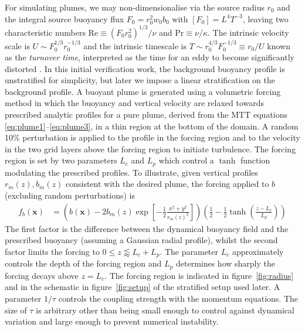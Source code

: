 \documentclass[a4paper]{article}
\begin{document}
For simulating plumes, we may non-dimensionalise via the source radius $r_0$ and the integral source buoyancy
flux $F_0 = r_0^2 w_0 b_0$ with $\left[F_0\right] = L^4 T^{-3}$, leaving two characteristic numbers
$\mathrm{Re} \equiv (F_0r_0^2)^{1/3}/\nu$ and $\mathrm{Pr} \equiv \nu /\kappa$. The intrinsic velocity scale
is $U \sim F_0^{1/3} r_0^{-1/3}$ and the intrinsic timescale is $T \sim r_0^{4/3} F_0^{-1/3} \equiv r_0/U$
known as the \emph{turnover time}, interpreted as the time for an eddy to become significantly distorted
\citep{frisch1995}. In this initial verification work, the background buoyancy profile is unstratified for
simplicity, but later we impose a linear stratification on the background profile. A buoyant plume is
generated using a volumetric forcing method in which the buoyancy and vertical velocity are relaxed towards
prescribed analytic profiles for a pure plume, derived from the MTT equations
\eqref{eq:plume1}--\eqref{eq:plume3}, in a thin region at the bottom of the domain. A random 10\% perturbation
is applied to the profile in the forcing region and to the velocity in the two grid layers above the forcing
region to initiate turbulence. The forcing region is set by two parameters $L_c$ and $L_p$ which control a
$\tanh$ function modulating the prescribed profiles. To illustrate, given vertical profiles $r_m(z), b_m(z)$
consistent with the desired plume, the forcing applied to $b$ (excluding random perturbations) is
\begin{align}
	f_b(\bm{x}) &= \left(b(\bm{x}) -
		2b_m(z)\exp\left[-\frac{1}{2}\frac{x^2+y^2}{r_m(z)^2}\right]\right)\left(\frac{1}{2}-\frac{1}{2}\tanh\left(\frac{z-L_c}{L_p}\right)\right)
\end{align}
The first factor is the difference between the dynamical buoyancy field and the prescribed buoyancy (assuming
a Gaussian radial profile), whilst the second factor limits the forcing to $0 \le z \lessapprox L_c + L_p$.
The parameter $L_c$ approximately controls the depth of the forcing region and $L_p$ determines how sharply
the forcing decays above $z=L_c$. The forcing region is indicated in figure~\ref{fig:radius} and in the
schematic in figure~\ref{fig:setup} of the stratified setup used later. A parameter $1/\tau$ controls the
coupling strength with the momentum equations. The size of $\tau$ is arbitrary other than being small enough
to control against dynamical variation and large enough to prevent numerical instability.
\end{document}
